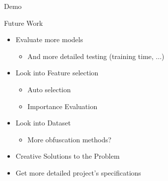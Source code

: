 \begin{frame}{Demo}
\end{frame}




\begin{frame}{Future Work}
    \begin{itemize}
        \item Evaluate more models
        \begin{itemize}
            \item And more detailed testing (training time, ...)
        \end{itemize}
        \item Look into Feature selection
        \begin{itemize}
            \item Auto selection
            \item Importance Evaluation
        \end{itemize}
        \item Look into Dataset
        \begin{itemize}
            \item More obfuscation methods?
        \end{itemize}
        \item Creative Solutions to the Problem
        \item Get more detailed project's specifications 
    \end{itemize}
\end{frame}
